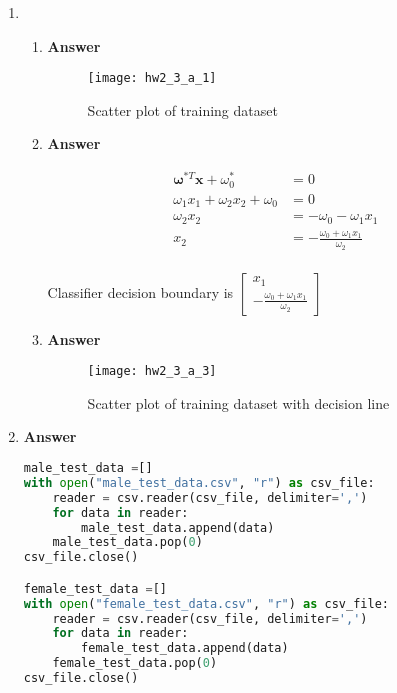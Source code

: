 \documentclass[11pt]{article}
\begin{document}
\begin{enumerate}[label=(\alph*)]

\item 

\begin{enumerate}[label=(\roman*)]

\item  \textbf{Answer}

\begin{figure}[H]
\centering
\texttt{[image: hw2\_3\_a\_1]}
\caption{Scatter plot of training dataset}
\label{fig: hw2_3_a_1}
\end{figure}

\newpage
\item  \textbf{Answer}

\begin{align*}
\mathbf{\omega}^{*T} \mathbf{x}+\omega_0^{*}& = 0 \\
\omega_1 x_1 + \omega_2 x_2 + \omega_0 &= 0  \\
\omega_2 x_2  &= -\omega_0 -  \omega_1 x_1 \\
 x_2  &= -\frac{\omega_0 +  \omega_1 x_1}{\omega_2} \\
\end{align*}

Classifier decision boundary is $
\begin{bmatrix}
x_1 \\
-\frac{\omega_0 +  \omega_1 x_1}{\omega_2}
\end{bmatrix}$

\item  \textbf{Answer}

\begin{figure}[H]
\centering
\texttt{[image: hw2\_3\_a\_3]}
\caption{Scatter plot of training dataset with decision line}
\label{fig: hw2_3_a_3}
\end{figure}

\end{enumerate}

\newpage
\item  \textbf{Answer}

\begin{lstlisting}[language=Python, showstringspaces=false]
male_test_data =[]
with open("male_test_data.csv", "r") as csv_file:
    reader = csv.reader(csv_file, delimiter=',')    
    for data in reader:
        male_test_data.append(data)        
    male_test_data.pop(0)   
csv_file.close()

female_test_data =[]
with open("female_test_data.csv", "r") as csv_file:    
    reader = csv.reader(csv_file, delimiter=',')    
    for data in reader:
        female_test_data.append(data)        
    female_test_data.pop(0)   
csv_file.close()


\end{lstlisting}
\end{enumerate}
\end{document}
